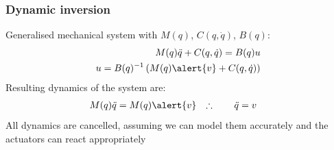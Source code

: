 \documentclass[10pt]{beamer-control}
\begin{document}
\begin{frame}
\frametitle{Dynamic inversion}
Generalised mechanical system with $M(q)$, $C(q,\dot q)$, $B(q)$:
\begin{align}
M(q)\ddot q + C(q,\dot q) = B(q) u \\
u = B(q)^{-1} \left( M(q) \alert{v} + C(q,\dot q) \right)
\end{align}
Resulting dynamics of the system are:
\begin{align}
M(q)\ddot q &= M(q) \alert{v} & \therefore\qquad \ddot q &= v
\end{align}
All dynamics are cancelled, assuming we can model them accurately and the actuators can react appropriately
\end{frame}

\SUMMARYFRAME
\FINALE
\end{document}
